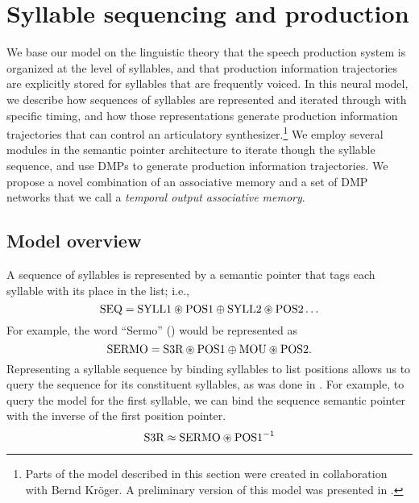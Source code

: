 \section{Syllable sequencing and production}


We base our model on the linguistic theory
that the speech production system
is organized at the level of syllables,
and that production information trajectories
are explicitly stored
for syllables that are frequently voiced.
In this neural model,
we describe how sequences of syllables are represented
and iterated through with specific timing,
and how those representations
generate production information trajectories
that can control an articulatory synthesizer.\footnote{
  Parts of the model described in this section were created
  in collaboration with Bernd Kr\"{o}ger.
  A preliminary version of this model was presented
  in \citet{kroger2014}.}
We employ several modules in the semantic pointer architecture
to iterate though the syllable sequence,
and use DMPs to generate production information trajectories.
We propose a novel combination of an associative memory
and a set of DMP networks
that we call a
\textit{temporal output associative memory}.

\subsection{Model overview}
\label{sec:impl-prod-overview}

A sequence of syllables is represented
by a semantic pointer
that tags each syllable with its place
in the list; i.e.,
\begin{equation}
  \text{SEQ} = \text{SYLL1} \circledast \text{POS1} \oplus
    \text{SYLL2} \circledast \text{POS2} \ldots
\end{equation}
For example, the word ``Sermo''
()
would be represented as
\begin{equation}
  \text{SERMO} = \text{S3R} \circledast \text{POS1} \oplus
    \text{MOU} \circledast \text{POS2}.
\end{equation}
Representing a syllable sequence
by binding syllables to list positions
allows us to query the sequence
for its constituent syllables,
as was done in \citet{choo2010,eliasmith2012}.
For example, to query the model
for the first syllable,
we can bind the sequence semantic pointer
with the inverse of the first position pointer.
\begin{equation}
  \text{S3R} \approx \text{SERMO} \circledast \text{POS1}^{-1}
\end{equation}

